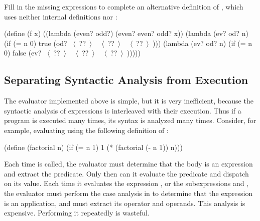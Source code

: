 \begin{exerciseGroup}
\begin{enumerate}[a.]
Fill in the missing expressions to complete an alternative definition of
, which uses neither internal definitions nor :

\begin{codeBlock}
(define (f x)
  ((lambda (even? odd?) (even? even? odd? x))
   (lambda (ev? od? n)
     (if (= n 0) true (od? ~\(\langle \)~??~\(\rangle \)~ ~\(\langle \)~??~\(\rangle \)~ ~\(\langle \)~??~\(\rangle \)~)))
   (lambda (ev? od? n)
     (if (= n 0) false (ev? ~\(\langle \)~??~\(\rangle \)~ ~\(\langle \)~??~\(\rangle \)~ ~\(\langle \)~??~\(\rangle \)~)))))
\end{codeBlock}
\end{enumerate}
\end{exerciseGroup}

\subsection{Separating Syntactic Analysis from Execution}
\label{Section 4.1.7}

The evaluator implemented above is simple, but it is very inefficient, because
the syntactic analysis of expressions is interleaved with their execution.
Thus if a program is executed many times, its syntax is analyzed many times.
Consider, for example, evaluating  using the following
definition of :

\begin{codeBlock}
(define (factorial n)
  (if (= n 1) 1 (* (factorial (- n 1)) n)))
\end{codeBlock}

\noindent
Each time  is called, the evaluator must determine that the
body is an  expression and extract the predicate.  Only then can it
evaluate the predicate and dispatch on its value.  Each time it evaluates the
expression , or the subexpressions
 and , the evaluator must perform the
case analysis in  to determine that the expression is an
application, and must extract its operator and operands.  This analysis is
expensive.  Performing it repeatedly is wasteful.

